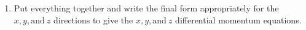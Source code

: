 \documentclass[../main.tex]{subfiles}
\begin{document}
\begin{enumerate}[label = (\alph*)]
\begin{enumerate}[label = (b\arabic*)]
        \item
            Put everything together and write the final form appropriately for the $x, y, \textrm{and} \ z$ directions to give the $x, y, \textrm{and} \  z$ differential momentum equations. 
        
    \end{enumerate}
    
\end{enumerate}
\end{document}
